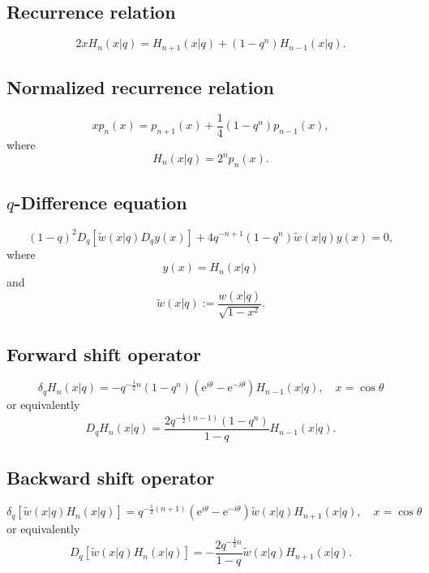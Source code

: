 \documentclass[envcountchap,graybox]{svmono}
\newcommand{\e}{\textrm{e}}
\begin{document}
\subsection*{Recurrence relation}
\begin{equation}
\label{RecContqHermite}
2xH_n(x|q)=H_{n+1}(x|q)+(1-q^n)H_{n-1}(x|q).
\end{equation}

\subsection*{Normalized recurrence relation}
\begin{equation}
\label{NormRecContqHermite}
xp_n(x)=p_{n+1}(x)+\frac{1}{4}(1-q^n)p_{n-1}(x),
\end{equation}
where
$$H_n(x|q)=2^np_n(x).$$

\subsection*{$q$-Difference equation}
\begin{equation}
\label{dvContqHermite}
(1-q)^2D_q\left[{\tilde w}(x|q)D_qy(x)\right]+4q^{-n+1}(1-q^n){\tilde w}(x|q)y(x)=0,
\end{equation}
where
$$y(x)=H_n(x|q)$$
and
$${\tilde w}(x|q):=\frac{w(x|q)}{\sqrt{1-x^2}}.$$

\subsection*{Forward shift operator}
\begin{equation}
\label{shift1ContqHermiteI}
\delta_qH_n(x|q)=-q^{-\frac{1}{2}n}(1-q^n)(\e^{i\theta}-\e^{-i\theta})H_{n-1}(x|q),
\quad x=\cos\theta
\end{equation}
or equivalently
\begin{equation}
\label{shift1ContqHermiteII}
D_qH_n(x|q)=\frac{2q^{-\frac{1}{2}(n-1)}(1-q^n)}{1-q}H_{n-1}(x|q).
\end{equation}

\subsection*{Backward shift operator}
\begin{equation}
\label{shift2ContqHermiteI}
\delta_q\left[{\tilde w}(x|q)H_n(x|q)\right]=
q^{-\frac{1}{2}(n+1)}(\e^{i\theta}-\e^{-i\theta})
{\tilde w}(x|q)H_{n+1}(x|q),\quad x=\cos\theta
\end{equation}
or equivalently
\begin{equation}
\label{shift2ContqHermiteII}
D_q\left[{\tilde w}(x|q)H_n(x|q)\right]=
-\frac{2q^{-\frac{1}{2}n}}{1-q}{\tilde w}(x|q)H_{n+1}(x|q).
\end{equation}
\end{document}
